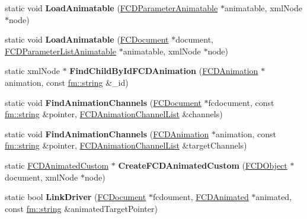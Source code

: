 \begin{DoxyCompactItemize}
\item 
\hypertarget{classFArchiveXML_aeffdfc74a3cb92835bdbbc2c96f1baf4}{
static void {\bfseries LoadAnimatable} (\hyperlink{classFCDParameterAnimatable}{FCDParameterAnimatable} $\ast$animatable, xmlNode $\ast$node)}
\label{classFArchiveXML_aeffdfc74a3cb92835bdbbc2c96f1baf4}

\item 
\hypertarget{classFArchiveXML_ab26f7d5436249b4fdaa0aa156cc99d7c}{
static void {\bfseries LoadAnimatable} (\hyperlink{classFCDocument}{FCDocument} $\ast$document, \hyperlink{classFCDParameterListAnimatable}{FCDParameterListAnimatable} $\ast$animatable, xmlNode $\ast$node)}
\label{classFArchiveXML_ab26f7d5436249b4fdaa0aa156cc99d7c}

\item 
\hypertarget{classFArchiveXML_aa2c06cf876f47a3b7f95021ee117ba66}{
static xmlNode $\ast$ {\bfseries FindChildByIdFCDAnimation} (\hyperlink{classFCDAnimation}{FCDAnimation} $\ast$animation, const \hyperlink{classfm_1_1stringT}{fm::string} \&\_\-id)}
\label{classFArchiveXML_aa2c06cf876f47a3b7f95021ee117ba66}

\item 
\hypertarget{classFArchiveXML_a646a4f6aee23ef1cf9e1d6429f4dd4d8}{
static void {\bfseries FindAnimationChannels} (\hyperlink{classFCDocument}{FCDocument} $\ast$fcdocument, const \hyperlink{classfm_1_1stringT}{fm::string} \&pointer, \hyperlink{classfm_1_1pvector}{FCDAnimationChannelList} \&channels)}
\label{classFArchiveXML_a646a4f6aee23ef1cf9e1d6429f4dd4d8}

\item 
\hypertarget{classFArchiveXML_a95051bf5aa5dde518da9f7ebc04b5218}{
static void {\bfseries FindAnimationChannels} (\hyperlink{classFCDAnimation}{FCDAnimation} $\ast$animation, const \hyperlink{classfm_1_1stringT}{fm::string} \&pointer, \hyperlink{classfm_1_1pvector}{FCDAnimationChannelList} \&targetChannels)}
\label{classFArchiveXML_a95051bf5aa5dde518da9f7ebc04b5218}

\item 
\hypertarget{classFArchiveXML_aae1c100720d9186e6fbb4cd9001addff}{
static \hyperlink{classFCDAnimatedCustom}{FCDAnimatedCustom} $\ast$ {\bfseries CreateFCDAnimatedCustom} (\hyperlink{classFCDObject}{FCDObject} $\ast$document, xmlNode $\ast$node)}
\label{classFArchiveXML_aae1c100720d9186e6fbb4cd9001addff}

\item 
\hypertarget{classFArchiveXML_afe88d7151c32efa5d9889e5b1ed30a7b}{
static bool {\bfseries LinkDriver} (\hyperlink{classFCDocument}{FCDocument} $\ast$fcdoument, \hyperlink{classFCDAnimated}{FCDAnimated} $\ast$animated, const \hyperlink{classfm_1_1stringT}{fm::string} \&animatedTargetPointer)}
\label{classFArchiveXML_afe88d7151c32efa5d9889e5b1ed30a7b}


\end{DoxyCompactItemize}
